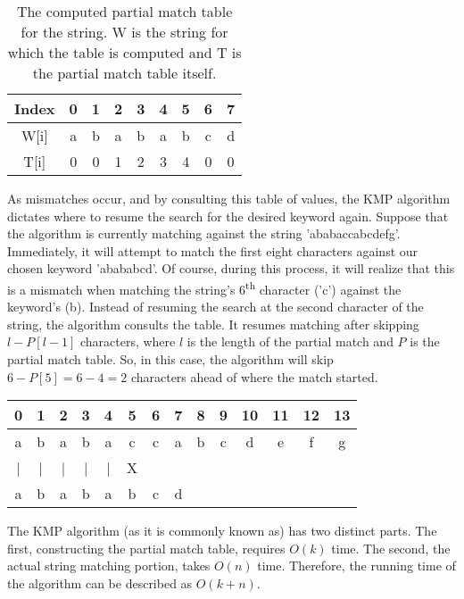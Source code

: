 \begin{table}[h]
	\begin{center}
		\begin{tabular}{ | c | c | c | c | c | c | c | c | c | }
			\hline
			Index & 0 & 1 & 2 & 3 & 4 & 5 & 6 & 7 \\ \hline
			W[i]  & a & b & a & b & a & b & c & d \\ \hline
			T[i]  & 0 & 0 & 1 & 2 & 3 & 4 & 0 & 0 \\ \hline
		\end{tabular}
		\caption{The computed partial match table for the string.
		W is the string for which the table is computed and T is the partial match table itself.}
	\end{center}
\end{table}

As mismatches occur, and by consulting this table of values, the KMP algorithm dictates where to resume the search for the desired keyword again.
Suppose that the algorithm is currently matching against the string 'ababaccabcdefg'.
Immediately, it will attempt to match the first eight characters against our chosen keyword 'abababcd'.
Of course, during this process, it will realize that this is a mismatch when matching the string's 6\textsuperscript{th} character ('c') against the keyword's (b).
Instead of resuming the search at the second character of the string, the algorithm consults the table.
It resumes matching after skipping $l - P[l - 1]$ characters, where $l$ is the length of the partial match and $P$ is the partial match table.
So, in this case, the algorithm will skip $6 - P[5] = 6 - 4 = 2$ characters ahead of where the match started.

\begin{center}
	\begin{tabular}{ | c | c | c | c | c | c | c | c | c | c | c | c | c | c | }
		\hline
		0 & 1 & 2 & 3 & 4 & 5 & 6 & 7 & 8 & 9 & 10 & 11 & 12 & 13 \\ \hline
		a & b & a & b & a & c & c & a & b & c & d & e & f & g \\ \hline
		| & | & | & | & | & X &   &   &   &   &   &   &   &   \\ \hline
		a & b & a & b & a & b & c & d &   &   &   &   &   &   \\ \hline

	\end{tabular}
\end{center}

The KMP algorithm (as it is commonly known as) has two distinct parts.
The first, constructing the partial match table, requires $O(k)$ time.
The second, the actual string matching portion, takes $O(n)$ time.
Therefore, the running time of the algorithm can be described as $O(k + n)$.

